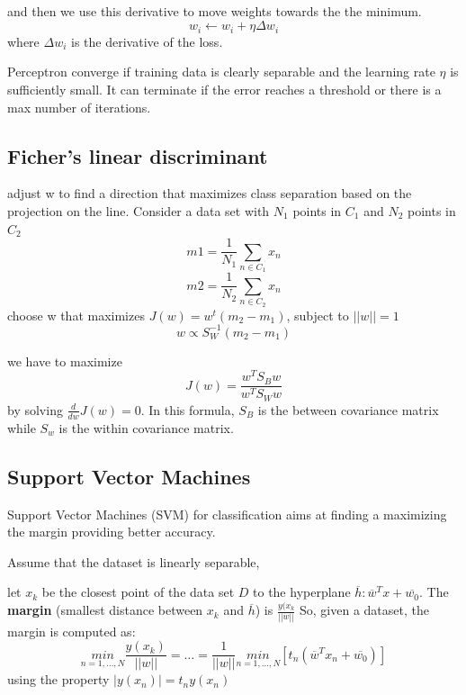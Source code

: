 and then we use this derivative to move weights towards the the minimum.
\begin{equation}
    w_{i} \xleftarrow{} w_{i} + \eta \Delta w_{i}
\end{equation}
where $\Delta w_{i}$ is the derivative of the loss. 

Perceptron converge if training data is clearly separable and the learning rate $\eta$ is sufficiently small.
It can terminate if the error reaches a threshold or there is a max number of iterations.

\subsection{Ficher's linear discriminant}
adjust w to find a direction that maximizes class separation based on the projection on the line. Consider a data set with $N_{1}$ points in $C_{1}$ and $N_{2}$ points in $C_{2}$
\begin{equation}
    m1 = \frac{1}{N_{1}}\sum_{n \in C_{1}}x_{n}
\end{equation}
\begin{equation}
    m2 = \frac{1}{N_{2}}\sum_{n \in C_{2}}x_{n}
\end{equation}
choose w that maximizes $J(w) = w^{t}(m_{2} - m_{1})$, subject to $||w|| = 1$
\begin{equation}
    w \propto S^{-1}_{W}(m_{2} - m_{1})
\end{equation}

we have to maximize 
\begin{equation}
    J(w) = \frac{w^{T}S_{B}w}{w^{T}S_{W}w}
\end{equation}
by solving $\frac{d}{dw}J(w) = 0$. In this formula, $S_{B}$ is the between covariance matrix while $S_{w}$ is the within covariance matrix.

\subsection{Support Vector Machines}
Support Vector Machines (SVM) for classification aims at finding a maximizing the margin providing better accuracy.

Assume that the dataset is linearly separable,

let $x_{k}$ be the closest point of the data set $D$ to the hyperplane $\overline{h}: \overline{w}^{T}x + \overline{w_{0}}$.
The \textbf{margin} (smallest distance between $x_{k}$ and $\overline{h}$) is $\frac{y(x_{k}}{||w||}$
So, given a dataset, the margin is computed as: 
\begin{equation}
    \underset{n=1, \dots , N}{min} \frac{y(x_{k})}{||w||} = \dots = \frac{1}{||w||} \underset{n=1, \dots , N}{min} [t_{n}(\overline{w}^{T}x_{n} + \overline{w_{0}})]
\end{equation}
using the property $|y(x_{n})| = t_{n}y(x_{n})$

